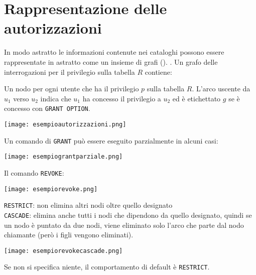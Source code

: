 \documentclass[12pt]{article}
\begin{document}
\section{Rappresentazione delle autorizzazioni}
In modo astratto le informazioni contenute nei cataloghi possono essere rappresentate in astratto come un insieme di grafi (). . Un grafo delle interrogazioni per il privilegio sulla tabella $R$ contiene:
\begin{center}
\end{center} 
Un nodo per ogni utente che ha il privilegio $p$ sulla tabella $R$. L'arco uscente da $u_{1}$ verso $u_{2}$ indica che $u_{1}$ ha concesso il privilegio a $u_{2}$ ed è etichettato $g$ se è concesso con \texttt{GRANT OPTION}.
\begin{center}
    \texttt{[image: esempioautorizzazioni.png]}
\end{center}
Un comando di \texttt{GRANT} può essere eseguito parzialmente in alcuni casi:
\begin{center}
    \texttt{[image: esempiograntparziale.png]}
\end{center}
Il comando \texttt{REVOKE}:
\begin{center}
    \texttt{[image: esempiorevoke.png]}
\end{center}
\texttt{RESTRICT}: non elimina altri nodi oltre quello designato\\
\texttt{CASCADE}: elimina anche tutti i nodi che dipendono da quello designato, quindi se un nodo è puntato da due nodi, viene eliminato solo l'arco che parte dal nodo chiamante (però i figli vengono eliminati).
\begin{center}
    \texttt{[image: esempiorevokecascade.png]}
\end{center}
Se non si specifica niente, il comportamento di default è \texttt{RESTRICT}.
\end{document}
